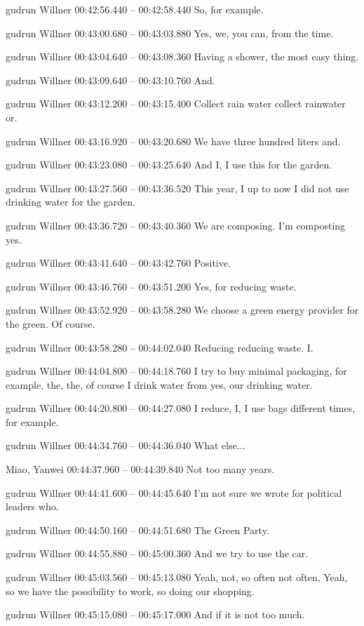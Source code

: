 {gudrun Willner 00:42:56.440 -- 00:42:58.440
So, for example.

gudrun Willner 00:43:00.680 -- 00:43:03.880
Yes, we, you can, from the time.

gudrun Willner 00:43:04.640 -- 00:43:08.360
Having a shower, the most easy thing.

gudrun Willner 00:43:09.640 -- 00:43:10.760
And.

gudrun Willner 00:43:12.200 -- 00:43:15.400
Collect rain water collect rainwater or.

gudrun Willner 00:43:16.920 -- 00:43:20.680
We have three hundred liters and.

gudrun Willner 00:43:23.080 -- 00:43:25.640
And I, I use this for the garden.

gudrun Willner 00:43:27.560 -- 00:43:36.520
This year, I up to now I did not use drinking water for the garden.

gudrun Willner 00:43:36.720 -- 00:43:40.360
We are composing. I'm composting yes.

gudrun Willner 00:43:41.640 -- 00:43:42.760
Positive.

gudrun Willner 00:43:46.760 -- 00:43:51.200
Yes, for reducing waste.

gudrun Willner 00:43:52.920 -- 00:43:58.280
We choose a green energy provider for the green. Of course.

gudrun Willner 00:43:58.280 -- 00:44:02.040
Reducing reducing waste. I.

gudrun Willner 00:44:04.800 -- 00:44:18.760
I try to buy minimal packaging, for example, the, the, of course I drink water from yes, our drinking water.

gudrun Willner 00:44:20.800 -- 00:44:27.080
I reduce, I, I use bags different times, for example.

gudrun Willner 00:44:34.760 -- 00:44:36.040
What else...

Miao, Yanwei 00:44:37.960 -- 00:44:39.840
Not too many years.

gudrun Willner 00:44:41.600 -- 00:44:45.640
I'm not sure we wrote for political leaders who.

gudrun Willner 00:44:50.160 -- 00:44:51.680
The Green Party.

gudrun Willner 00:44:55.880 -- 00:45:00.360
And we try to use the car.

gudrun Willner 00:45:03.560 -- 00:45:13.080
Yeah, not, so often not often, Yeah, so we have the possibility to work, so doing our shopping.

gudrun Willner 00:45:15.080 -- 00:45:17.000
And if it is not too much.

}
